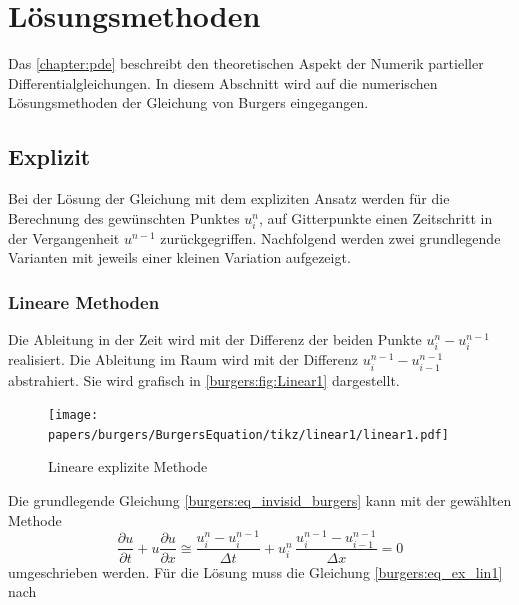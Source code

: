 %
%
\section{Lösungsmethoden
\label{burgers:section:loesung}}

Das \autoref{chapter:pde} beschreibt den theoretischen Aspekt der Numerik  partieller Differentialgleichungen.
In diesem Abschnitt wird auf die numerischen Lösungsmethoden der Gleichung von Burgers eingegangen.


\subsection{Explizit}

Bei der Lösung der Gleichung mit dem expliziten Ansatz werden für die Berechnung des gewünschten Punktes $u_i^n$, auf Gitterpunkte einen Zeitschritt in der Vergangenheit $u^{n-1}$ zurückgegriffen.
Nachfolgend werden zwei grundlegende Varianten mit jeweils einer kleinen Variation aufgezeigt.

\subsubsection{Lineare Methoden}

	Die Ableitung in der Zeit wird mit der Differenz der beiden Punkte $u_{i}^{n}-u_{i}^{n-1}$ realisiert.
	Die Ableitung im Raum wird mit der Differenz $u_{i}^{n-1}-u_{i-1}^{n-1}$ abstrahiert.
	Sie wird grafisch in \autoref{burgers:fig:Linear1} dargestellt.


	     \begin{figure}
		\centering
		\texttt{[image: papers/burgers/BurgersEquation/tikz/linear1/linear1.pdf]}
		\caption{Lineare explizite Methode}
		\label{burgers:fig:Linear1}
		\end{figure}

	Die grundlegende Gleichung \eqref{burgers:eq_invisid_burgers} kann mit der gewählten Methode
	\begin{equation}
	  	\frac {\partial u}{\partial t}+u{\frac {\partial u}{\partial x}} \cong \frac{u_{i}^{n}-u_{i}^{n-1}}{\Delta t}+ u_{i}^{n}\, \frac{u_{i}^{n-1}-u_{i-1}^{n-1}}{\Delta x}=0
	  	  \label{burgers:eq_ex_lin1}
	  	\end{equation}
        umgeschrieben werden.
	  	Für die Lösung muss die Gleichung \eqref{burgers:eq_ex_lin1} nach

